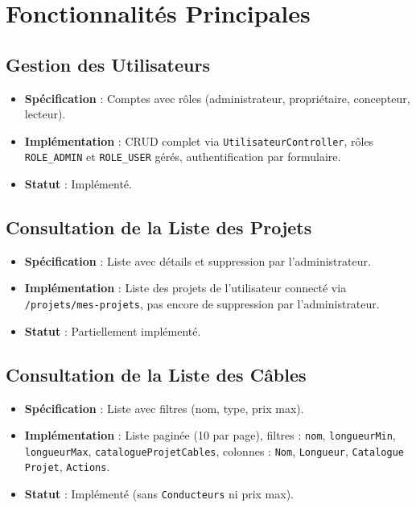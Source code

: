 \documentclass[a4paper,12pt]{article}
\begin{document}
\section{Fonctionnalités Principales}

\subsection{Gestion des Utilisateurs}
\begin{itemize}
    \item \textbf{Spécification} : Comptes avec rôles (administrateur, propriétaire, concepteur, lecteur).
    \item \textbf{Implémentation} : CRUD complet via \texttt{UtilisateurController}, rôles \texttt{ROLE\_ADMIN} et \texttt{ROLE\_USER} gérés, authentification par formulaire.
    \item \textbf{Statut} : Implémenté.
\end{itemize}

\subsection{Consultation de la Liste des Projets}
\begin{itemize}
    \item \textbf{Spécification} : Liste avec détails et suppression par l’administrateur.
    \item \textbf{Implémentation} : Liste des projets de l’utilisateur connecté via \texttt{/projets/mes-projets}, pas encore de suppression par l’administrateur.
    \item \textbf{Statut} : Partiellement implémenté.
\end{itemize}

\subsection{Consultation de la Liste des Câbles}
\begin{itemize}
    \item \textbf{Spécification} : Liste avec filtres (nom, type, prix max).
    \item \textbf{Implémentation} : Liste paginée (10 par page), filtres : \texttt{nom}, \texttt{longueurMin}, \texttt{longueurMax}, \texttt{catalogueProjetCables}, colonnes : \texttt{Nom}, \texttt{Longueur}, \texttt{Catalogue Projet}, \texttt{Actions}.
    \item \textbf{Statut} : Implémenté (sans \texttt{Conducteurs} ni prix max).
\end{itemize}
\end{document}
